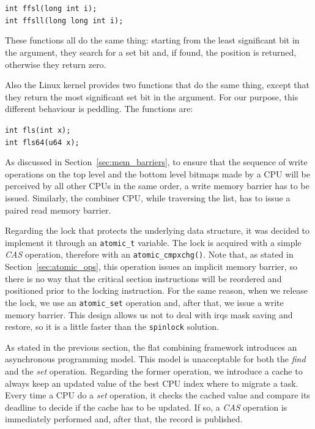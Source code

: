 \begin{center}
\texttt{int ffsl(long int i);}\\
\texttt{int ffsll(long long int i);}
\end{center}

These functions all do the same thing: starting from the least significant bit in the
argument, they search for a set bit and, if found, the position is returned, otherwise
they return zero.

Also the Linux kernel provides two functions that do the same thing, except that they
return the most significant set bit in the argument. For our purpose, this different
behaviour is peddling. The functions are:

\begin{center}
\texttt{int fls(int x);}\\
\texttt{int fls64(u64 x);}
\end{center}

As discussed in Section~\ref{sec:mem_barriers}, to ensure that the sequence of write 
operations on the top level and the bottom level bitmaps made by a CPU will be 
perceived by all other CPUs in the same order, a write memory barrier has to be issued.
Similarly, the combiner CPU, while traversing the list, has to issue a paired read 
memory barrier.

Regarding the lock that protects the underlying data structure, it was decided to 
implement it through an \texttt{atomic\_t} variable. 
The lock is acquired with a simple \emph{CAS} operation, therefore with an 
\texttt{atomic\_cmpxchg()}. Note that, as stated in Section~\ref{sec:atomic_ops}, 
this operation issues an implicit memory barrier, so there is no way that the 
critical section instructions will be reordered and positioned prior to the 
locking instruction. For the same reason, when we release the lock, we use an 
\texttt{atomic\_set} operation and, after that, we issue a write
memory barrier. This design allows us not to deal with irqs mask saving and restore,
so it is a little faster than the \texttt{spinlock} solution.

As stated in the previous section, the flat combining framework introduces an
asynchronous programming model. This model is unacceptable for both the \emph{find}
and the \emph{set} operation.
Regarding the former operation, we introduce a cache
to always keep an updated value of the best CPU index where to migrate a task. Every
time a CPU do a \emph{set} operation, it checks the cached value and compare its
deadline to decide if the cache has to be updated. If so, a \emph{CAS} operation is
immediately performed and, after that, the record is published.

